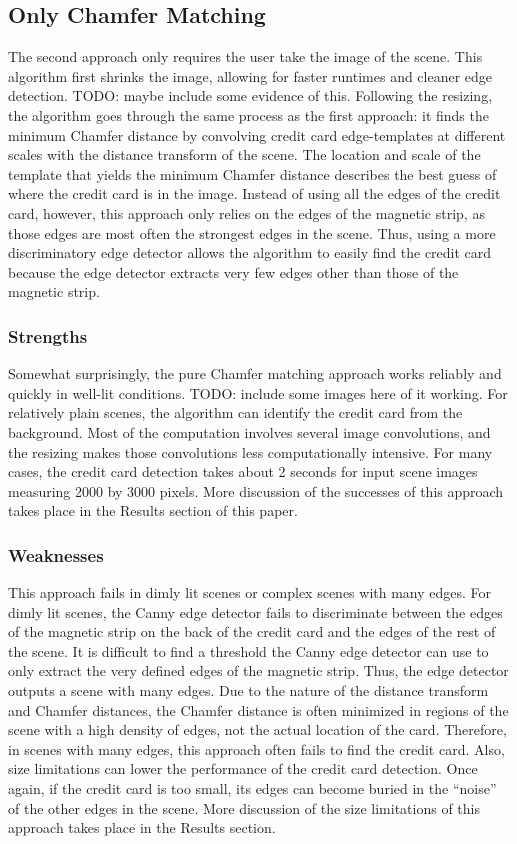 \documentclass[10pt,twocolumn,letterpaper]{article}
\begin{document}
\subsection{Only Chamfer Matching}
The second approach only requires the user take the image of the scene. This algorithm first shrinks the image, allowing for faster runtimes and cleaner edge detection. TODO: maybe include some evidence of this. Following the resizing, the algorithm goes through the same process as the first approach: it finds the minimum Chamfer distance by convolving credit card edge-templates at different scales with the distance transform of the scene. The location and scale of the template that yields the minimum Chamfer distance describes the best guess of where the credit card is in the image. 
	Instead of using all the edges of the credit card, however, this approach only relies on the edges of the magnetic strip, as those edges are most often the strongest edges in the scene. Thus, using a more discriminatory edge detector allows the algorithm to easily find the credit card because the edge detector extracts very few edges other than those of the magnetic strip.

\subsubsection{Strengths}
	Somewhat surprisingly, the pure Chamfer matching approach works reliably and quickly in well-lit conditions. TODO: include some images here of it working. For relatively plain scenes, the algorithm can identify the credit card from the background. Most of the computation involves several image convolutions, and the resizing makes those convolutions less computationally intensive. For many cases, the credit card detection takes about 2 seconds for input scene images measuring 2000 by 3000 pixels. More discussion of the successes of this approach takes place in the Results section of this paper.
\subsubsection{Weaknesses}
	This approach fails in dimly lit scenes or complex scenes with many edges. For dimly lit scenes, the Canny edge detector fails to discriminate between the edges of the magnetic strip on the back of the credit card and the edges of the rest of the scene. It is difficult to find a threshold the Canny edge detector can use to only extract the very defined edges of the magnetic strip. Thus, the edge detector outputs a scene with many edges. Due to the nature of the distance transform and Chamfer distances, the Chamfer distance is often minimized in regions of the scene with a high density of edges, not the actual location of the card. Therefore, in scenes with many edges, this approach often fails to find the credit card.
Also, size limitations can lower the performance of the credit card detection. Once again, if the credit card is too small, its edges can become buried in the “noise” of the other edges in the scene. More discussion of the size limitations of this approach takes place in the Results section.
\end{document}
